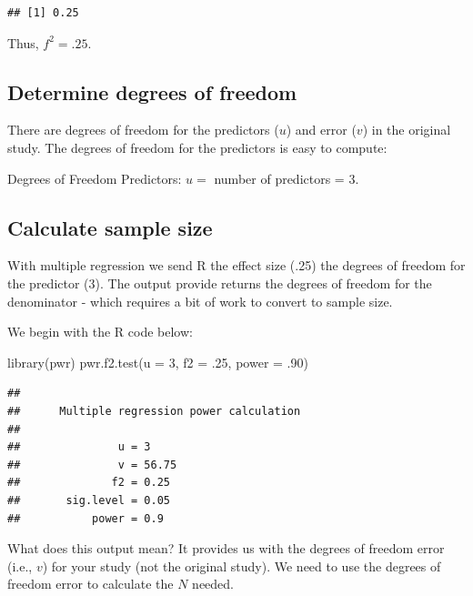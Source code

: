 \documentclass[
]{krantz}
\makeatletter
\newenvironment{Shaded}{\begin{snugshade}}{\end{snugshade}}
\newcommand{\AttributeTok}[1]{\textcolor[rgb]{0.61,0.61,0.61}{#1}}
\newcommand{\DecValTok}[1]{\textcolor[rgb]{0.06,0.06,0.06}{#1}}
\newcommand{\FunctionTok}[1]{\textcolor[rgb]{0,0,0}{#1}}
\newcommand{\NormalTok}[1]{#1}
\newenvironment{kframe}{%
\medskip{}
\setlength{\fboxsep}{.8em}
 \def\at@end@of@kframe{}%
 \ifinner\ifhmode%
  \def\at@end@of@kframe{\end{minipage}}%
  \begin{minipage}{\columnwidth}%
 \fi\fi%
 \def\FrameCommand##1{\hskip\@totalleftmargin \hskip-\fboxsep
 \colorbox{shadecolor}{##1}\hskip-\fboxsep
     \hskip-\linewidth \hskip-\@totalleftmargin \hskip\columnwidth}%
 \MakeFramed {\advance\hsize-\width
   \@totalleftmargin\z@ \linewidth\hsize
   \@setminipage}}%
 {\par\unskip\endMakeFramed%
 \at@end@of@kframe}
\renewenvironment{Shaded}{\begin{kframe}}{\end{kframe}}
\makeatother
\begin{document}
\begin{verbatim}
## [1] 0.25
\end{verbatim}

Thus, \(f^2=.25\).

\hypertarget{determine-degrees-of-freedom}{%
\subsection{Determine degrees of freedom}\label{determine-degrees-of-freedom}}

There are degrees of freedom for the predictors (\(u\)) and error (\(v\)) in the original study. The degrees of freedom for the predictors is easy to compute:

Degrees of Freedom Predictors: \(u =\) number of predictors = 3.

\hypertarget{calculate-sample-size}{%
\subsection{Calculate sample size}\label{calculate-sample-size}}

With multiple regression we send R the effect size (.25) the degrees of freedom for the predictor (3). The output provide returns the degrees of freedom for the denominator - which requires a bit of work to convert to sample size.

We begin with the R code below:

\begin{Shaded}
\begin{Highlighting}[]
\FunctionTok{library}\NormalTok{(pwr)}
\FunctionTok{pwr.f2.test}\NormalTok{(}\AttributeTok{u =} \DecValTok{3}\NormalTok{,}
            \AttributeTok{f2 =}\NormalTok{ .}\DecValTok{25}\NormalTok{,}
            \AttributeTok{power =}\NormalTok{ .}\DecValTok{90}\NormalTok{)}
\end{Highlighting}
\end{Shaded}

\begin{verbatim}
## 
##      Multiple regression power calculation 
## 
##               u = 3
##               v = 56.75
##              f2 = 0.25
##       sig.level = 0.05
##           power = 0.9
\end{verbatim}

What does this output mean? It provides us with the degrees of freedom error (i.e., \(v\)) for your study (not the original study). We need to use the degrees of freedom error to calculate the \(N\) needed.
\end{document}
